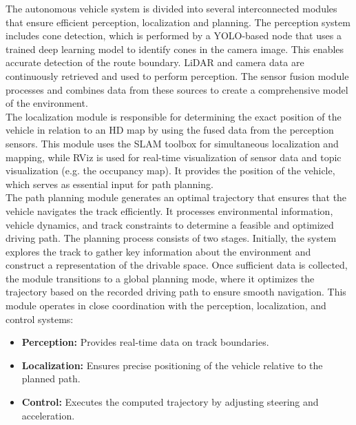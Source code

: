 The autonomous vehicle system is divided into several interconnected modules that ensure efficient perception, localization and planning. 
The perception system includes cone detection, which is performed by a YOLO-based node that uses a trained deep learning model to identify cones in the camera image. This enables accurate detection of the route boundary. 
LiDAR and camera data are continuously retrieved and used to perform perception. The sensor fusion module processes and combines data from these sources to create a comprehensive model of the environment.\\
\newline
The localization module is responsible for determining the exact position of the vehicle in relation to an HD map by using the fused data from the perception sensors. 
This module uses the SLAM toolbox for simultaneous localization and mapping, while RViz is used for real-time visualization of sensor data and topic visualization (e.g. the occupancy map). It provides the position of the vehicle, which serves as essential input for path planning.\\
\newline
The path planning module generates an optimal trajectory that ensures that the vehicle navigates the track efficiently. It processes environmental information, vehicle dynamics, and track constraints to determine a feasible and optimized driving path.
The planning process consists of two stages. Initially, the system explores the track to gather key information about the environment and construct a representation of the drivable space. Once sufficient data is collected, the module transitions to a global planning mode, where it optimizes the trajectory based on the recorded driving path to ensure smooth navigation. 
This module operates in close coordination with the perception, localization, and control systems:
\begin{itemize}
    \item \textbf{Perception:} Provides real-time data on track boundaries.
    \item \textbf{Localization:} Ensures precise positioning of the vehicle relative to the planned path.
    \item \textbf{Control:} Executes the computed trajectory by adjusting steering and acceleration.
\end{itemize}